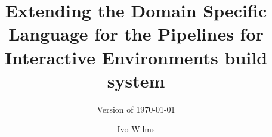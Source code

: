 
\title{Extending the Domain Specific Language for the Pipelines for Interactive Environments build system}
\subtitle{Version of \today}
\author{Ivo Wilms}
